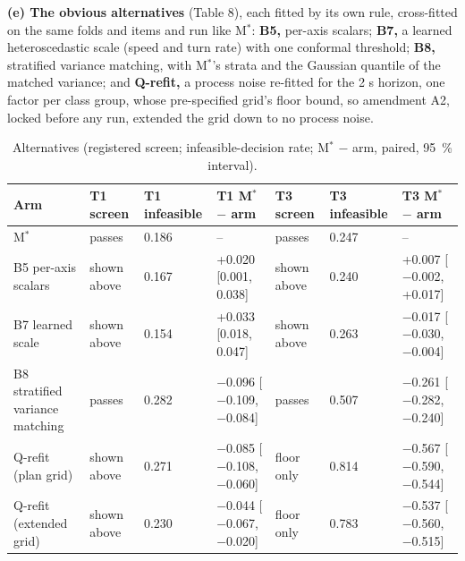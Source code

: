 \documentclass{ieeeaccess}
\begin{document}
\textbf{(e) The obvious alternatives} (Table 8), each fitted by its own rule, cross-fitted on the same folds and items and run like M$^{*}$: \textbf{B5,} per-axis scalars; \textbf{B7,} a learned heteroscedastic scale (speed and turn rate) with one conformal threshold; \textbf{B8,} stratified variance matching, with M$^{*}$'s strata and the Gaussian quantile of the matched variance; and \textbf{Q-refit,} a process noise re-fitted for the 2 s horizon, one factor per class group, whose pre-specified grid's floor bound, so amendment A2, locked before any run, extended the grid down to no process noise.

\begin{table}[!t]
\centering
\caption{Alternatives (registered screen; infeasible-decision rate; M$^{*}$ $-$ arm, paired, 95~\% interval).}
\label{tab:8}
\footnotesize
\setlength{\tabcolsep}{4pt}
\renewcommand{\arraystretch}{1.15}
\begin{tabular}{@{}L{0.233\textwidth}L{0.083\textwidth}L{0.079\textwidth}L{0.170\textwidth}L{0.083\textwidth}L{0.079\textwidth}L{0.170\textwidth}@{}}
\hline
Arm & T1 screen & T1 infeasible & T1 M$^{*}$ $-$ arm & T3 screen & T3 infeasible & T3 M$^{*}$ $-$ arm \\
\hline
M$^{*}$ & passes & 0.186 & -- & passes & 0.247 & -- \\
B5 per-axis scalars & shown above & 0.167 & +0.020 [0.001, 0.038] & shown above & 0.240 & +0.007 [$-$0.002, +0.017] \\
B7 learned scale & shown above & 0.154 & +0.033 [0.018, 0.047] & shown above & 0.263 & $-$0.017 [$-$0.030, $-$0.004] \\
B8 stratified variance matching & passes & 0.282 & $-$0.096 [$-$0.109, $-$0.084] & passes & 0.507 & $-$0.261 [$-$0.282, $-$0.240] \\
Q-refit (plan grid) & shown above & 0.271 & $-$0.085 [$-$0.108, $-$0.060] & floor only & 0.814 & $-$0.567 [$-$0.590, $-$0.544] \\
Q-refit (extended grid) & shown above & 0.230 & $-$0.044 [$-$0.067, $-$0.020] & floor only & 0.783 & $-$0.537 [$-$0.560, $-$0.515] \\
\hline
\end{tabular}
\end{table}
\end{document}
